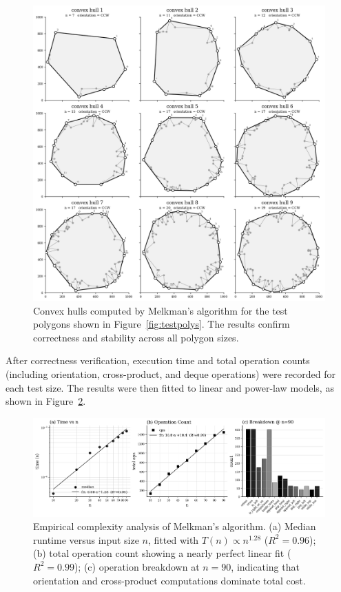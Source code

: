 \documentclass{article}
\begin{document}
\begin{figure}[H]
    \centering
    \includegraphics[width=0.95\linewidth]{Pictures/test_hulls.png}
    \caption{Convex hulls computed by Melkman’s algorithm for the test polygons shown in Figure~\ref{fig:testpolys}. 
    The results confirm correctness and stability across all polygon sizes.}
    \label{fig:testhulls}
\end{figure}

After correctness verification, execution time and total operation counts (including orientation, cross-product, and deque operations) were recorded for each test size. 
The results were then fitted to linear and power-law models, as shown in Figure~\ref{fig:complexity}.

\begin{figure}[H]
    \centering
    \includegraphics[width=0.95\linewidth]{Pictures/melkman_complexity.png}
    \caption{Empirical complexity analysis of Melkman’s algorithm. 
    (a) Median runtime versus input size $n$, fitted with $T(n)\propto n^{1.28}$ ($R^2=0.96$); 
    (b) total operation count showing a nearly perfect linear fit ($R^2=0.99$); 
    (c) operation breakdown at $n=90$, indicating that orientation and cross-product computations dominate total cost.}
    \label{fig:complexity}
\end{figure}
\end{document}
